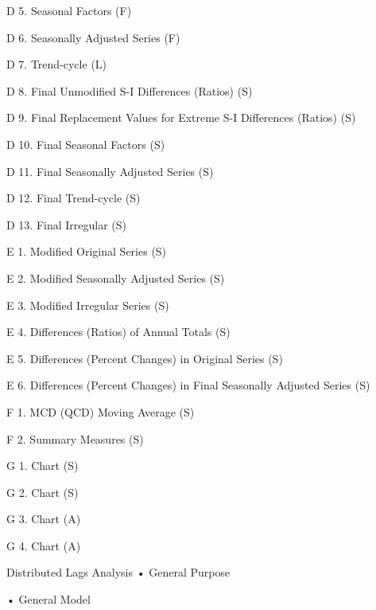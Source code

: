D 5. Seasonal Factors (F) 
 



D 6. Seasonally Adjusted Series (F) 
 



D 7. Trend-cycle (L) 
 



D 8. Final Unmodified S-I Differences (Ratios) (S) 
 



D 9. Final Replacement Values for Extreme S-I Differences (Ratios) (S) 
 



D 10. Final Seasonal Factors (S) 
 



D 11. Final Seasonally Adjusted Series (S) 
 



D 12. Final Trend-cycle (S) 
 



D 13. Final Irregular (S) 
 



E 1. Modified Original Series (S) 
 



E 2. Modified Seasonally Adjusted Series (S) 
 



E 3. Modified Irregular Series (S) 
 



E 4. Differences (Ratios) of Annual Totals (S) 
 



E 5. Differences (Percent Changes) in Original Series (S) 
 



E 6. Differences (Percent Changes) in Final Seasonally Adjusted Series (S) 
 



F 1. MCD (QCD) Moving Average (S) 
 



F 2. Summary Measures (S) 
 



G 1. Chart (S) 
 



G 2. Chart (S) 
 



G 3. Chart (A) 
 



G 4. Chart (A) 
 

Distributed Lags Analysis
•
General Purpose

•
General Model

